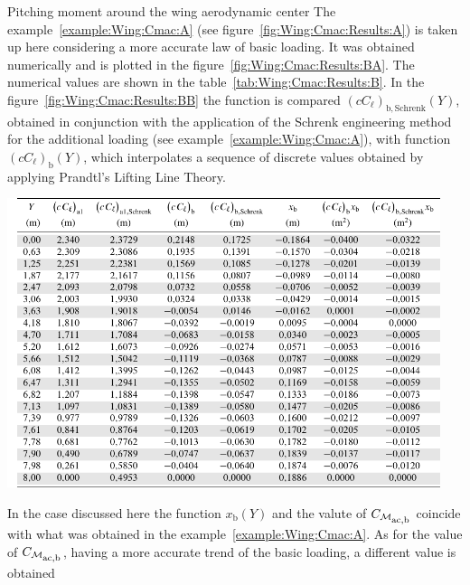 \documentclass[[12pt,twoside]{book}
\begin{document}
%

%
\begin{myExampleX}{Pitching moment around the wing aerodynamic center}{}%
\label{example:Wing:Cmac:B}
%
\noindent
The example~\ref{example:Wing:Cmac:A} (see figure~\ref{fig:Wing:Cmac:Results:A}) is taken up here considering
a more accurate law of basic loading.
It was obtained numerically and is plotted in the figure~\ref{fig:Wing:Cmac:Results:BA}.
The numerical values are shown in the table~\ref{tab:Wing:Cmac:Results:B}.
%
In the figure~\ref{fig:Wing:Cmac:Results:BB} the function is compared
$(cC_\ell)_\mathrm{b,Schrenk}(Y)$, obtained in conjunction with the application of the Schrenk engineering method for the additional loading (see example~\ref{example:Wing:Cmac:A}),
with function $(cC_\ell)_\mathrm{b}(Y)$, which interpolates a sequence of discrete values
obtained by applying Prandtl's Lifting Line Theory.

\begin{table}[tb]
\caption{%
 Wing assigned in the examples~\ref{example:Wing:Cmac:A} e ~\ref{example:Wing:Cmac:B}.
Numerical values with which the basic loading was calculated $(cC_\ell)_\mathrm{b}$ 
  applying Prandtl's Lifting Line Theory..
}
\label{tab:Wing:Cmac:Results:B}
\centering
\includegraphics[width=0.95\textwidth]{Chapter_2/pitching_moment_two/wing_Cmac_2_loading_table.pdf}
\end{table}

In the case discussed here the function $x_\mathrm{b}(Y)$ and the valute of
 $C_{\mathcal{M}_\mathlarger{\mathrm{ac,b}}}$ coincide with what was obtained
in the example~\ref{example:Wing:Cmac:A}.
As for the value of $C_{\mathcal{M}_\mathlarger{\mathrm{ac,b}}}$, having a more accurate trend of the basic loading, a different value is obtained


\end{myExampleX}
\end{document}
